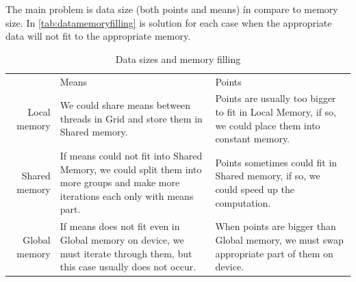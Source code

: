 The main problem is data size (both points and means) ín compare to memory size. In \autoref{tab:datamemoryfilling} is solution for each case when the appropriate data will not fit to the appropriate memory.

\def\tabularxcolumn#1{m{#1}}
\begin{table}[h]
\centering
\caption{Data sizes and memory filling}
\label{tab:datamemoryfilling}
\begin{tabularx}{\textwidth}{|r|Y|Y|}
&Means&Points\\ 
{} Local memory&We could  share means between threads in Grid and store them in Shared memory.& Points are usually too bigger to fit in Local Memory, if so, we could place them into constant memory.\\ 
{} Shared memory&If means could not fit into Shared Memory, we could split them into more groups and make more iterations each only with means part.&Points sometimes could fit in Shared memory, if so, we could speed up the computation.\\ 
{} Global memory&If means does not fit even in Global memory on device, we must iterate through them, but this case usually does not occur.& When points are bigger than Global memory, we must swap appropriate part of them on device.\\ 
\end{tabularx}
\end{table}

